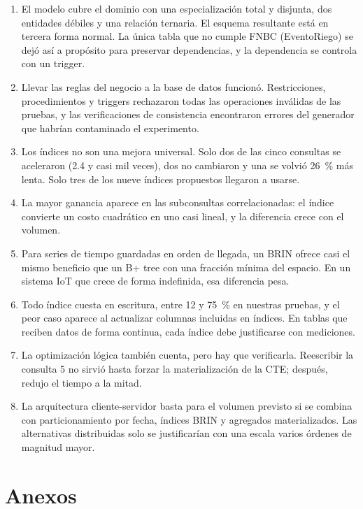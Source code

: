 \documentclass[11pt,letterpaper]{article}
\newcommand{\tbus}{\textunderscore\allowbreak}
\newcommand{\tb}[1]{{\ttfamily\let\_\tbus #1}}
\begin{document}
\begin{enumerate}[leftmargin=1.6em,itemsep=0.25em]
\item El modelo cubre el dominio con una especialización total y disjunta, dos entidades débiles y una relación ternaria. El esquema resultante está en tercera forma normal. La única tabla que no cumple FNBC (\tb{Evento\_Riego}) se dejó así a propósito para preservar dependencias, y la dependencia se controla con un trigger.
\item Llevar las reglas del negocio a la base de datos funcionó. Restricciones, procedimientos y triggers rechazaron todas las operaciones inválidas de las pruebas, y las verificaciones de consistencia encontraron errores del generador que habrían contaminado el experimento.
\item Los índices no son una mejora universal. Solo dos de las cinco consultas se aceleraron (2.4 y casi mil veces), dos no cambiaron y una se volvió 26~\% más lenta. Solo tres de los nueve índices propuestos llegaron a usarse.
\item La mayor ganancia aparece en las subconsultas correlacionadas: el índice convierte un costo cuadrático en uno casi lineal, y la diferencia crece con el volumen.
\item Para series de tiempo guardadas en orden de llegada, un BRIN ofrece casi el mismo beneficio que un B+ tree con una fracción mínima del espacio. En un sistema IoT que crece de forma indefinida, esa diferencia pesa.
\item Todo índice cuesta en escritura, entre 12 y 75~\% en nuestras pruebas, y el peor caso aparece al actualizar columnas incluidas en índices. En tablas que reciben datos de forma continua, cada índice debe justificarse con mediciones.
\item La optimización lógica también cuenta, pero hay que verificarla. Reescribir la consulta 5 no sirvió hasta forzar la materialización de la CTE; después, redujo el tiempo a la mitad.
\item La arquitectura cliente-servidor basta para el volumen previsto si se combina con particionamiento por fecha, índices BRIN y agregados materializados. Las alternativas distribuidas solo se justificarían con una escala varios órdenes de magnitud mayor.
\end{enumerate}

\section{Anexos}
\end{document}
